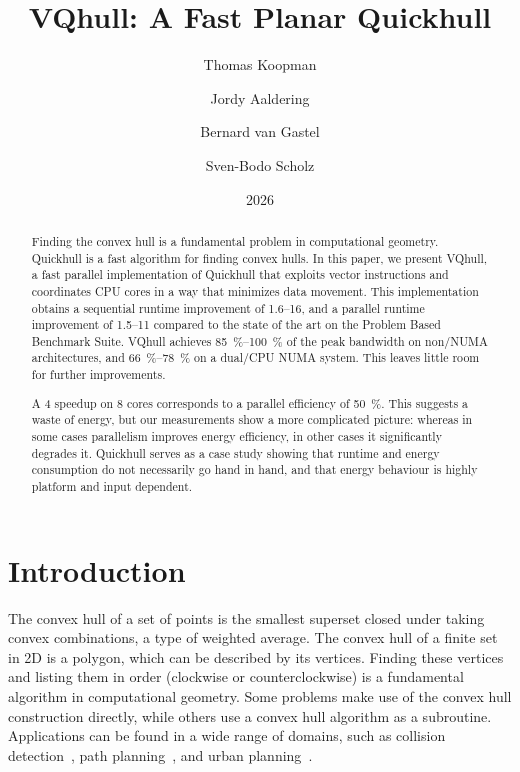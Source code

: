 \documentclass[11pt,a4paper]{article}
\title{VQhull: A Fast Planar Quickhull}
\author{Thomas Koopman \and Jordy Aaldering \and Bernard {van Gastel} \and Sven-Bodo Scholz}
\date{2026}
\begin{document}
\maketitle

\begin{abstract}
Finding the convex hull is a fundamental problem in computational geometry.
Quickhull is a fast algorithm for finding convex hulls.
In this paper, we present VQhull, a fast parallel implementation of Quickhull that exploits vector instructions and coordinates CPU cores in a way that minimizes data movement.
This implementation obtains a sequential runtime improvement of \qtyrange{1.6}{16}{\times}, and a parallel runtime improvement of \qtyrange{1.5}{11}{\times} compared to the state of the art on the Problem Based Benchmark Suite.
VQhull achieves \qtyrange{85}{100}{\percent} of the peak bandwidth on non\-/NUMA architectures, and \qtyrange{66}{78}{\percent} on a dual\-/CPU NUMA system.
This leaves little room for further improvements.

A \qty{4}{\times} speedup on 8 cores corresponds to a parallel efficiency of \qty{50}{\percent}.
This suggests a waste of energy, but our measurements show a more complicated picture: whereas in some cases parallelism improves energy efficiency, in other cases it significantly degrades it.
Quickhull serves as a case study showing that runtime and energy consumption do not necessarily go hand in hand, and that energy behaviour is highly platform and input dependent.
\end{abstract}

\section{Introduction}
The convex hull of a set of points is the smallest superset closed under taking convex combinations, a type of weighted average.
The convex hull of a finite set in 2D is a polygon, which can be described by its vertices.
Finding these vertices and listing them in order (clockwise or counterclockwise) is a fundamental algorithm in computational geometry.
Some problems make use of the convex hull construction directly, while others use a convex hull algorithm as a subroutine.
Applications can be found in a wide range of domains, such as collision detection~\cite{tang2008collision}, path planning~\cite{meeran1997optimum}, and urban planning~\cite{kang2017measuring}.
\end{document}
